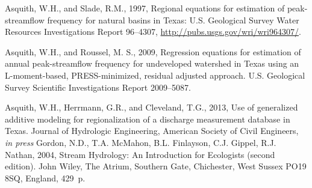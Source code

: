 \documentclass[12pt]{article}
\begin{document}
%



\begin{thebibliography}{3}


%
Asquith, W.H., and Slade, R.M., 1997, Regional equations for estimation of peak-streamflow frequency for natural basins in Texas: U.S. Geological Survey Water Resources Investigations Report 96--4307, \url{http://pubs.usgs.gov/wri/wri964307/}.

Asquith, W.H., and Roussel, M. S., 2009, Regression equations for estimation of annual peak-streamflow frequency for undeveloped watershed in Texas using an L-moment-based, PRESS-minimized, residual adjusted approach. U.S. Geological Survey Scientific Investigations Report 2009--5087.

Asquith, W.H., Herrmann, G.R., and Cleveland, T.G., 2013, Use of generalized additive modeling for regionalization of a discharge measurement database in Texas. Journal of Hydrologic Engineering, American Society of Civil Engineers, \textsl{in press}
%
Gordon, N.D., T.A. McMahon, B.L. Finlayson, C.J. Gippel, R.J. Nathan, 2004,
Stream Hydrology: An Introduction for Ecologists (second edition). John Wiley, The Atrium, Southern Gate, Chichester, West Sussex PO19 8SQ,
England, 429~p.

%



\end{thebibliography}
\end{document}
